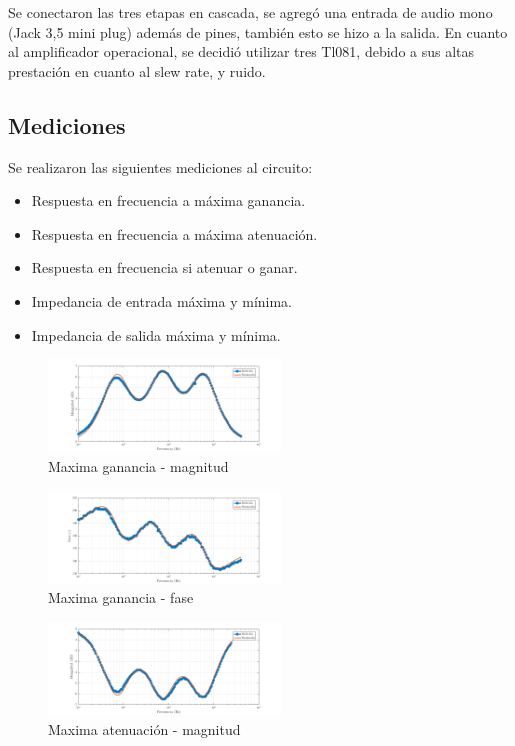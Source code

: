 \documentclass[../../tc_tp3_main.tex]{subfiles}
\begin{document}
Se conectaron las tres etapas en cascada, se agregó una entrada de audio mono (Jack 3,5 mini plug) además de pines, también esto se hizo a la salida. En cuanto al amplificador operacional, se decidió utilizar tres Tl081, debido a sus altas prestación en cuanto al slew rate, y ruido.

\subsection{Mediciones}
Se realizaron las siguientes mediciones al circuito:
\begin{itemize}
 \item Respuesta en frecuencia a máxima ganancia.
 \item Respuesta en frecuencia a máxima atenuación.
 \item Respuesta en frecuencia si atenuar o ganar.
 \item Impedancia de entrada máxima y mínima.
 \item Impedancia de salida máxima y mínima.
\end{itemize}

\begin{figure}[H]
\centering
\includegraphics[width=0.55\textwidth]{imagenes/max_m.png}
\caption{Maxima ganancia - magnitud} 
\end{figure}

\begin{figure}[H]
\centering
\includegraphics[width=0.55\textwidth]{imagenes/max_f.png}
\caption{Maxima ganancia - fase} 
\end{figure}

\begin{figure}[H]
\centering
\includegraphics[width=0.55\textwidth]{imagenes/min_m.png}
\caption{Maxima atenuación - magnitud} 
\end{figure}
\end{document}
